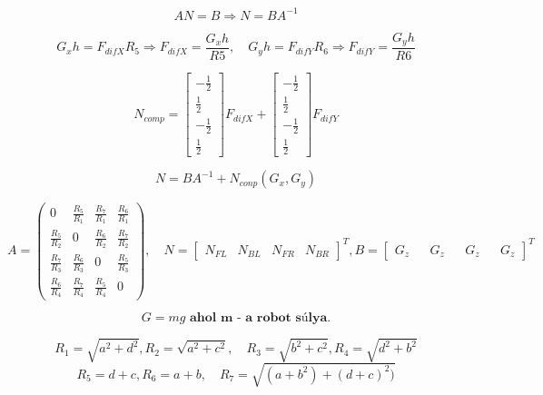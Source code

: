 
\iffalse
\begin{equation}
    AN=B \Rightarrow N=BA^{-1}
\end{equation}

\begin{equation}
G_xh=F_{difX}R_5\Rightarrow F_{difX}=\frac{G_{x}h}{R5}, \quad
G_yh=F_{difY}R_6\Rightarrow F_{difY}=\frac{G_{y}h}{R6}
\end{equation}

\begin{equation}
N_{comp} = \begin{bmatrix}
-\frac{1}{2}\\ 
\frac{1}{2}\\ 
-\frac{1}{2}\\ 
\frac{1}{2}
\end{bmatrix}F_{difX}
+
\begin{bmatrix}
-\frac{1}{2}\\ 
\frac{1}{2}\\ 
-\frac{1}{2}\\ 
\frac{1}{2}
\end{bmatrix}F_{difY}
\end{equation}

\begin{equation}
    N=BA^{-1} + N_{conp}(G_x,G_y)
\end{equation}

\begin{equation*}
A =\begin{pmatrix}
0 & \frac{R_5}{R_1} & \frac{R_7}{R_1} & \frac{R_6}{R_1}\\ 
\frac{R_5}{R_2} &  0&  \frac{R_6}{R_2}& \frac{R_7}{R_2} \\ 
\frac{R_7}{R_3} & \frac{R_6}{R_3} & 0 & \frac{R_5}{R_3} \\ 
\frac{R_6}{R_4} & \frac{R_7}{R_4} & \frac{R_5}{R_4}& 0
\end{pmatrix},\quad
N =\begin{bmatrix}
N_{FL} & N_{BL} & N_{FR} & N_{BR} 
\end{bmatrix}^T,
B=\begin{bmatrix}
G_z&& 
G_z&& 
G_z&& 
G_z
\end{bmatrix}^T
\end{equation*}

\begin{equation*}
    G=mg \textbf{ ahol m - a robot súlya.}
\end{equation*}

\begin{equation*}
R_1 = \sqrt{a^2+d^2},R_2 = \sqrt{a^2+c^2},\quad
R_3 = \sqrt{b^2+c^2}, R_4 = \sqrt{d^2+b^2}
\end{equation*}
\begin{equation*}
R_5 = d+c, R_6 = a+b,\quad
R_7 = \sqrt{(a+b^2)+(d+c)^2)} 
\end{equation*} 

